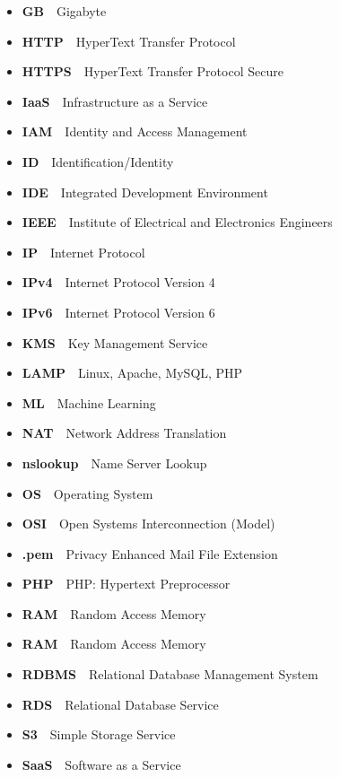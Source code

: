 \begin{itemize}
    \item  \textbf{GB}~\textemdash~Gigabyte
    \item  \textbf{HTTP}~\textemdash~HyperText Transfer Protocol
    \item  \textbf{HTTPS}~\textemdash~HyperText Transfer Protocol Secure
    \item  \textbf{IaaS}~\textemdash~Infrastructure as a Service
    \item  \textbf{IAM}~\textemdash~Identity and Access Management
    \item  \textbf{ID}~\textemdash~Identification/Identity
    \item  \textbf{IDE}~\textemdash~Integrated Development Environment
    \item  \textbf{IEEE}~\textemdash~Institute of Electrical and Electronics Engineers
    \item  \textbf{IP}~\textemdash~Internet Protocol
    \item  \textbf{IPv4}~\textemdash~Internet Protocol Version 4
    \item  \textbf{IPv6}~\textemdash~Internet Protocol Version 6
    \item  \textbf{KMS}~\textemdash~Key Management Service
    \item  \textbf{LAMP}~\textemdash~Linux, Apache, MySQL, PHP
    \item  \textbf{ML}~\textemdash~Machine Learning
    \item  \textbf{NAT}~\textemdash~Network Address Translation
    \item  \textbf{nslookup}~\textemdash~Name Server Lookup
    \item  \textbf{OS}~\textemdash~Operating System
    \item  \textbf{OSI}~\textemdash~Open Systems Interconnection (Model)
    \item  \textbf{.pem}~\textemdash~Privacy Enhanced Mail File Extension
    \item  \textbf{PHP}~\textemdash~PHP: Hypertext Preprocessor
    \item  \textbf{RAM}~\textemdash~Random Access Memory
    \item  \textbf{RAM}~\textemdash~Random Access Memory
    \item  \textbf{RDBMS}~\textemdash~Relational Database Management System
    \item  \textbf{RDS}~\textemdash~Relational Database Service
    \item  \textbf{S3}~\textemdash~Simple Storage Service
    \item  \textbf{SaaS}~\textemdash~Software as a Service

\end{itemize}
